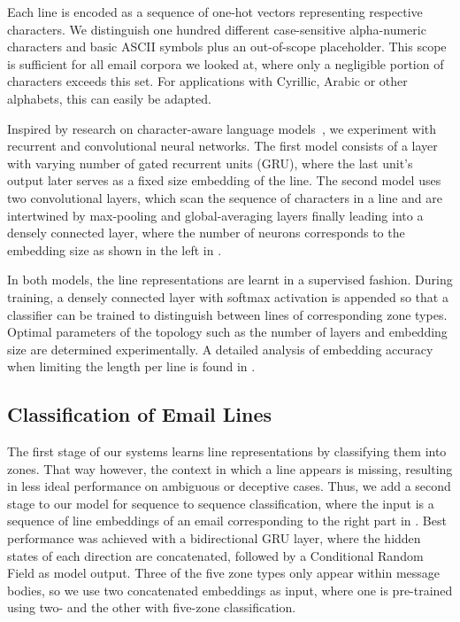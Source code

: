 \documentclass{llncs}
\begin{document}
Each line is encoded as a sequence of one-hot vectors representing respective characters.
We distinguish one hundred different case-sensitive alpha-numeric characters and basic ASCII symbols plus an out-of-scope placeholder.
This scope is sufficient for all email corpora we looked at, where only a negligible portion of characters exceeds this set.
For applications with Cyrillic, Arabic or other alphabets, this can easily be adapted.

Inspired by research on character-aware language models~\cite{char_nn}, we experiment with recurrent and convolutional neural networks.
The first model consists of a layer with varying number of gated recurrent units (GRU), where the last unit's output later serves as a fixed size embedding of the line.
The second model uses two convolutional layers, which scan the sequence of characters in a line and are intertwined by max-pooling and global-averaging layers finally leading into a densely connected layer, where the number of neurons corresponds to the embedding size as shown in the left in .

In both models, the line representations are learnt in a supervised fashion.
During training, a densely connected layer with softmax activation is appended so that a classifier can be trained to distinguish between lines of corresponding zone types.
Optimal parameters of the topology such as the number of layers and embedding size are determined experimentally.
A detailed analysis of embedding accuracy when limiting the length per line is found in .



\subsection{Classification of Email Lines}
The first stage of our systems learns line representations by classifying them into zones.
That way however, the context in which a line appears is missing, resulting in less ideal performance on ambiguous or deceptive cases.
Thus, we add a second stage to our model for sequence to sequence classification, where the input is a sequence of line embeddings of an email corresponding to the right part in .
Best performance was achieved with a bidirectional GRU layer, where the hidden states of each direction are concatenated, followed by a Conditional Random Field as model output.
Three of the five zone types only appear within message bodies, so we use two  concatenated embeddings as input, where one is pre-trained using two- and the other with five-zone classification.
\end{document}
